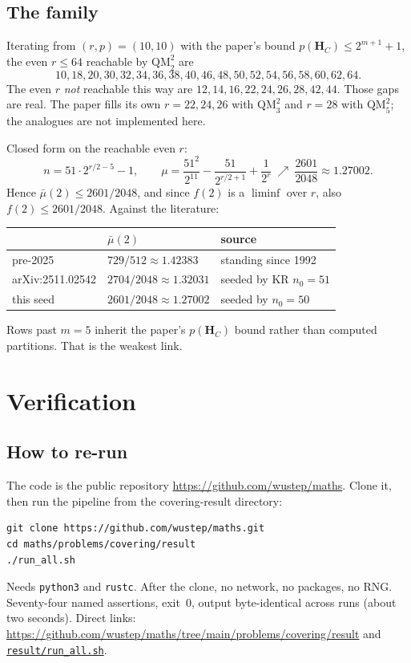 \documentclass[11pt,a4paper]{article}
\newcommand{\HH}{\boldsymbol{H}}
\begin{document}
\subsection{The family}

Iterating from $(r,p)=(10,10)$ with the paper's bound
$p(\HH_C)\le 2^{m+1}+1$, the even $r\le 64$ reachable by
$\mathrm{QM}_2^2$ are
\[
10,18,20,30,32,34,36,38,40,46,48,50,52,54,56,58,60,62,64.
\]
The even $r$ \emph{not} reachable this way are
$12,14,16,22,24,26,28,42,44$. Those gaps are real. The paper fills its
own $r=22,24,26$ with $\mathrm{QM}_3^2$ and $r=28$ with
$\mathrm{QM}_5^2$; the analogues are not implemented here.

Closed form on the reachable even $r$:
\[
n=51\cdot 2^{r/2-5}-1,\qquad
\mu=\frac{51^2}{2^{11}}-\frac{51}{2^{r/2+1}}+\frac{1}{2^r}
\ \nearrow\ \frac{2601}{2048}\approx 1.27002.
\]
Hence $\bar\mu(2)\le 2601/2048$, and since $f(2)$ is a $\liminf$ over $r$,
also $f(2)\le 2601/2048$. Against the literature:

\begin{center}
\renewcommand{\arraystretch}{1.15}
\begin{tabular}{@{}lll@{}}
\toprule
 & $\bar\mu(2)$ & source \\
\midrule
pre-2025 & $729/512\approx 1.42383$ & standing since 1992 \\
arXiv:2511.02542 & $2704/2048\approx 1.32031$ & seeded by KR $n_0=51$ \\
this seed & $2601/2048\approx 1.27002$ & seeded by $n_0=50$ \\
\bottomrule
\end{tabular}
\end{center}

Rows past $m=5$ inherit the paper's $p(\HH_C)$ bound rather than computed
partitions. That is the weakest link.

\section{Verification}

\subsection{How to re-run}

The code is the public repository
\url{https://github.com/wustep/maths}.
Clone it, then run the pipeline from the covering-result directory:

\begin{verbatim}
git clone https://github.com/wustep/maths.git
cd maths/problems/covering/result
./run_all.sh
\end{verbatim}
Needs \texttt{python3} and \texttt{rustc}. After the clone, no network,
no packages, no RNG. Seventy-four named assertions, exit~$0$, output
byte-identical across runs (about two seconds). Direct links:
\url{https://github.com/wustep/maths/tree/main/problems/covering/result}
and
\href{https://github.com/wustep/maths/blob/main/problems/covering/result/run_all.sh}{\texttt{result/run\_all.sh}}.
\end{document}
